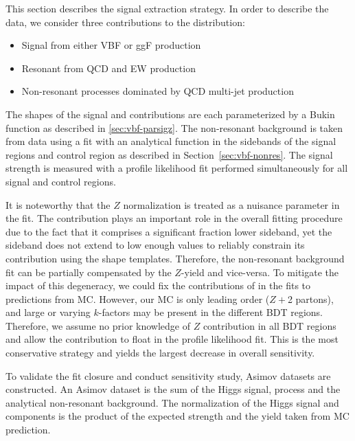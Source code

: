 \label{sec:vbf-statanalysis}
This section describes the signal extraction strategy. In order to describe the data, we consider three contributions to the \Mbb{} distribution:  
\begin{itemize}
  \item Signal \Hbb from either VBF or ggF production
  \item Resonant \zjets{} from QCD and EW production
  \item Non-resonant processes dominated by QCD multi-jet production
\end{itemize}

The shapes of the signal and \zjets{} contributions are each parameterized by a Bukin function as described in \ref{sec:vbf-parsigz}. The non-resonant background is taken from data using a fit with an analytical function in the \Mbb{} sidebands of the signal regions and control region as described in Section~\ref{sec:vbf-nonres}.
The signal strength is measured with a profile likelihood fit performed simultaneously for all signal and control regions.

It is noteworthy that the $Z$ normalization is treated as a nuisance parameter in the fit. The \zjets{} contribution plays an important role in the overall fitting procedure due to the fact that it comprises a significant fraction lower \Mbb{} sideband, yet the sideband does not extend to low enough \Mbb{} values to reliably constrain its contribution using the shape templates.  Therefore, the non-resonant background fit can be partially compensated by the $Z$-yield and vice-versa.  To mitigate the impact of this degeneracy, we could fix the contributions of \zjets{} in the fits to predictions from MC.  However, our \zjets{} MC is only leading order ($Z+$2 partons), and large or varying $k$-factors may be present in the different BDT regions.  Therefore, we assume no prior knowledge of $Z$ contribution in all BDT regions and allow the contribution to float in the profile likelihood fit. This is the most conservative strategy and yields the largest decrease in overall sensitivity.

To validate the fit closure and conduct sensitivity study, Asimov datasets are constructed. An Asimov dataset is the sum of the Higgs signal, \zjets{} process and the analytical non-resonant background. The normalization of the Higgs signal and \zjets{} components is the product of the expected strength and the yield taken from MC prediction.


